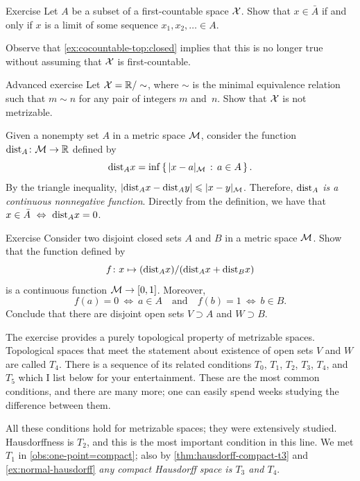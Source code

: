 \begin{thm}{Exercise}\label{ex:first-countable-seq}
Let $A$ be a subset of a first-countable space $\mathcal{X}$.
Show that $x\in \bar A$ if and only if $x$ is a limit of some sequence $x_1,x_2,\ldots \in A$.

Observe that \ref{ex:cocountable-top:closed} implies that this is no longer true without assuming that $\mathcal{X}$ is first-countable.

\end{thm}

\begin{thm}{Advanced exercise}\label{ex:ezh}
Let $\mathcal{X}=\mathbb{R}/\sim$, where $\sim$ is the minimal equivalence relation such that $m\sim n$ for any pair of integers $m$ and~$n$.
Show that $\mathcal{X}$ is not metrizable.
\end{thm}


Given a nonempty set $A$ in a metric space $\mathcal{M}$, consider the function $\mathrm{dist}_A\colon\mathcal{M}\to \mathbb{R}$ defined by
\[\mathrm{dist}_Ax=\inf\left\{\,{|x-a|_{\mathcal{M}}}\,:\,{a\in A}\,\right\}.\]
By the triangle inequality, $|\mathrm{dist}_Ax-\mathrm{dist}_Ay|\leqslant |x-y|_{\mathcal{M}}$.
Therefore, \textit{$\mathrm{dist}_A$ is a continuous nonnegative function}.
Directly from the definition, we have that $x\in\bar A\ \Leftrightarrow\ \dist_Ax=0$.


\begin{thm}{Exercise}\label{ex:distfun}
Consider two disjoint closed sets $A$ and $B$ in a metric space $\mathcal{M}$.
Show that the function defined by
\[f\colon x\mapsto (\mathrm{dist}_Ax)/(\mathrm{dist}_Ax+\mathrm{dist}_Bx)\]
is a continuous function $\mathcal{M}\to[0,1]$.
Moreover,
\[f(a)=0\ \Leftrightarrow\ a\in A
\quad\text{and}\quad
f(b)=1\ \Leftrightarrow\ b\in B.
\]
Conclude that there are disjoint open sets $V\supset A$ and $W\supset B$.
\end{thm}


The exercise provides a purely topological property of metrizable spaces.
Topological spaces that meet the statement about existence of open sets $V$ and $W$ are called
$T_4$.
There is a sequence of its related conditions $T_0$, $T_1$, $T_2$, $T_3$, $T_4$, and $T_5$ which I list below for your entertainment.
These are the most common conditions, and there are many more;
one can easily spend weeks studying the difference between them.

All these conditions hold for metrizable spaces; they were extensively studied.
Hausdorffness is $T_2$, and this is the most important condition in this line.
We met $T_1$ in \ref{obs:one-point=compact};
also by \ref{thm:hausdorff-compact-t3} and \ref{ex:normal-hausdorff} \textit{any compact Hausdorff space is $T_3$ and $T_4$}.

